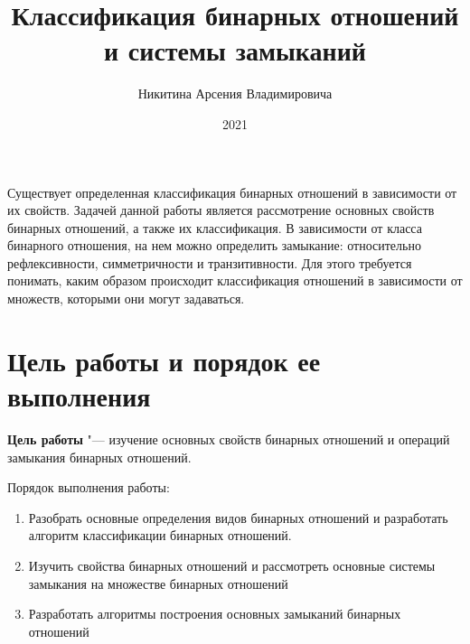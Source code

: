 \documentclass[bachelor, och, labwork]{shiza}
\begin{document}

\title{Классификация бинарных отношений и системы замыканий}





\author{Никитина Арсения Владимировича}



\date{2021}

\maketitle


\tableofcontents

\intro

Существует определенная классификация бинарных отношений в зависимости от их 
свойств. Задачей данной работы является рассмотрение основных свойств бинарных 
отношений, а также их классификация. В зависимости от класса бинарного 
отношения, на нем можно определить замыкание: относительно рефлексивности,
симметричности и транзитивности. Для этого требуется понимать, каким образом 
происходит классификация отношений в зависимости от множеств, которыми они могут
задаваться.

\section{\textbf{Цель работы и порядок ее выполнения}}

\textbf{Цель работы} "--- изучение основных свойств бинарных отношений и 
операций замыкания бинарных отношений.

Порядок выполнения работы:

\begin{enumerate}

    \item Разобрать основные определения видов бинарных отношений и разработать
    алгоритм классификации бинарных отношений.

    \item Изучить свойства бинарных отношений и рассмотреть основные системы
    замыкания на множестве бинарных отношений

    \item Разработать алгоритмы построения основных замыканий бинарных отношений

\end{enumerate}
\end{document}
